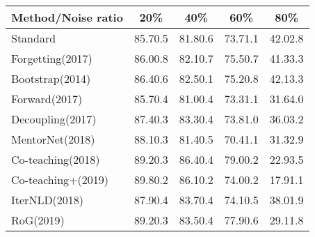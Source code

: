 \documentclass[letterpaper]{article} \usepackage{aaai22}  \usepackage{times}  \usepackage{helvet}  \usepackage{courier}  \usepackage[hyphens]{url}  \usepackage{graphicx} \urlstyle{rm} \def\UrlFont{\rm}  \usepackage{natbib}  \usepackage{caption} \DeclareCaptionStyle{ruled}{labelfont=normalfont,labelsep=colon,strut=off} \frenchspacing  \setlength{\pdfpagewidth}{8.5in}  \setlength{\pdfpageheight}{11in}  \usepackage{algorithm}
\begin{document}
\begin{table}[H]
\scriptsize
\centering
\begin{tabular}{@{}l|cccc@{}}
\toprule
Method/Noise ratio & 20\%                                   & 40\%                                   & 60\%                                   & 80\%                                   \\ \midrule
Standard           & 85.70.5                              & 81.80.6                              & 73.71.1                              & 42.02.8                              \\ \midrule
Forgetting(2017)         & 86.00.8                              & 82.10.7                              & 75.50.7                              & 41.33.3                              \\ \midrule
Bootstrap(2014)          & 86.40.6                              & 82.50.1                              & 75.20.8                              & 42.13.3                              \\ \midrule
Forward(2017)            & 85.70.4                              & 81.00.4                              & 73.31.1                              & 31.64.0                              \\ \midrule
Decoupling(2017)         & 87.40.3                              & 83.30.4                              & 73.81.0                              & 36.03.2                              \\ \midrule
MentorNet(2018)          & 88.10.3                              & 81.40.5                              & 70.41.1                              & 31.32.9                              \\ \midrule
Co-teaching(2018)        & 89.20.3                              & 86.40.4                              & 79.00.2                              & 22.93.5                              \\ \midrule
Co-teaching+(2019)       & 89.80.2                              & 86.10.2                              & 74.00.2                              & 17.91.1                              \\ \midrule
IterNLD(2018)            & 87.90.4                              & 83.70.4                              & 74.10.5                              & 38.01.9                              \\ \midrule
RoG(2019)                & {89.20.3}          & {83.50.4}          & {77.90.6}          & {29.11.8}          \\ \midrule

\end{tabular}
\end{table}
\end{document}

